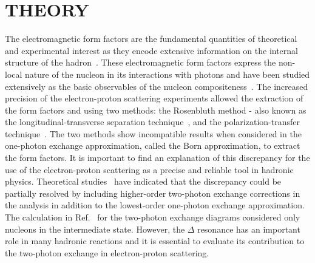 \chapter{THEORY}
\label{THEORY}

The electromagnetic form factors are the fundamental quantities of theoretical and experimental interest as they encode extensive information on the internal structure of the hadron~\cite{Dahiya:2011tv}.
These electromagnetic form factors express the non-local nature of the nucleon in its interactions with photons and have been studied extensively as the basic observables of the nucleon compositeness~\cite{PhysRevLett.95.172503}. 
The increased precision of the electron-proton scattering experiments allowed the extraction of the form factors and using two methods: the Rosenbluth method - also known as the longitudinal-transverse separation technique~\cite{PhysRevD.49.5671,PhysRevD.50.5491,PhysRevLett.94.142301}, and the polarization-transfer technique~\cite{PhysRevLett.84.1398,PhysRevLett.88.092301}.
The two methods show incompatible results when considered in the one-photon exchange approximation, called the Born approximation, to extract the form factors.
It is important to find an explanation of this discrepancy for the use of the electron-proton scattering as a precise and reliable tool in hadronic physics.
Theoretical studies~\cite{PhysRevLett.91.142304,Kondratyuk:2006am} have indicated that the discrepancy could be partially resolved by including higher-order two-photon exchange corrections in the analysis in addition to the lowest-order one-photon exchange approximation.
The calculation in Ref.~\cite{PhysRevLett.91.142304} for the two-photon exchange diagrams considered only nucleons in the intermediate state. 
However, the $\Delta$ resonance has an important role in many hadronic reactions and it is essential to evaluate its contribution to the two-photon exchange in electron-proton scattering.




